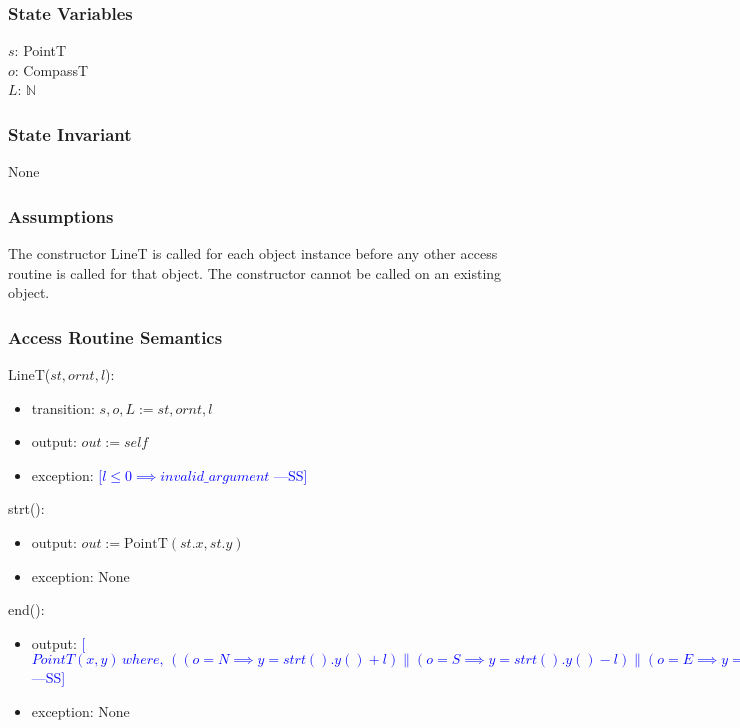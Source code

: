 \documentclass[12pt]{article}
\newcommand{\authornote}[3]{\textcolor{#1}{[#3 ---#2]}}
\newcommand{\authornote}[3]{}
\newcommand{\wss}[1]{\authornote{blue}{SS}{#1}}
\begin{document}
\subsubsection* {State Variables}

$s$: PointT\\
$o$: CompassT\\
$L$: $\mathbb{N}$\\ 

\subsubsection* {State Invariant}

None

\subsubsection* {Assumptions}

The constructor LineT is called for each object instance before any other
access routine is called for that object.  The constructor cannot be called on
an existing object.

\subsubsection* {Access Routine Semantics}

LineT($st, ornt, l$):
\begin{itemize}
\item transition: $s, o, L := st, ornt, l$
\item output: $out := \mathit{self}$
\item exception: \wss{$l \leq 0 \implies invalid\_argument$}
\end{itemize}

\noindent strt():
\begin{itemize}
\item output: $out := \mbox{PointT}(st.x, st.y)$
\item exception: None
\end{itemize}

\noindent end():
\begin{itemize}
\item output: \wss{$PointT(x, y)\, where,\, ( (o = N \implies y = strt().y() + l) \| (o = S \implies y = strt().y() - l) \| (o = E \implies y = strt().x() + l) \| (o = W \implies y = strt().x() - l) )$}

\item exception: None
\end{itemize}
\end{document}
